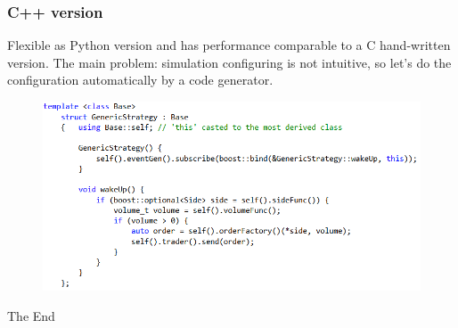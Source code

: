 \documentclass{beamer}
\begin{document}
\begin{frame}
\frametitle{C++ version}
Flexible as Python version and has performance comparable to a C hand-written version. The main problem: simulation configuring is not intuitive, so let's do the configuration automatically by a code generator.
\begin{figure}[htbp]
\centering
\includegraphics[width=1\linewidth]{c++sample.png}
\end{figure}
\end{frame}

\begin{frame}
\Huge{\centerline{The End}}
\end{frame}

\end{document}
